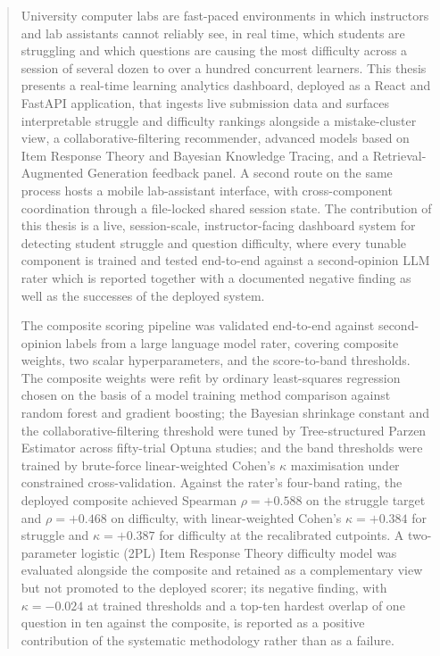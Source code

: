 \documentclass{article}
\numberwithin{figure}{section}
\numberwithin{table}{section}
\numberwithin{equation}{section}
\begin{document}
\begin{titlepage}

\end{titlepage}


\begin{abstract}

University computer labs are fast-paced environments in which instructors and lab assistants cannot reliably see, in real time, which students are struggling and which questions are causing the most difficulty across a session of several dozen to over a hundred concurrent learners.
This thesis presents a real-time learning analytics dashboard, deployed as a React and FastAPI application, that ingests live submission data and surfaces interpretable struggle and difficulty rankings alongside a mistake-cluster view, a collaborative-filtering recommender, advanced models based on Item Response Theory and Bayesian Knowledge Tracing, and a Retrieval-Augmented Generation feedback panel.
A second route on the same process hosts a mobile lab-assistant interface, with cross-component coordination through a file-locked shared session state. 
The contribution of this thesis is a live, session-scale, instructor-facing dashboard system for detecting student struggle and question difficulty, where every tunable component is trained and tested end-to-end against a second-opinion LLM rater which is reported together with a documented negative finding as well as the successes of the deployed system.

The composite scoring pipeline was validated end-to-end against second-opinion labels from a large language model rater, covering composite weights, two scalar hyperparameters, and the score-to-band thresholds.
The composite weights were refit by ordinary least-squares regression chosen on the basis of a model training method comparison against random forest and gradient boosting; the Bayesian shrinkage constant and the collaborative-filtering threshold were tuned by Tree-structured Parzen Estimator across fifty-trial Optuna studies; and the band thresholds were trained by brute-force linear-weighted Cohen's $\kappa$ maximisation under constrained cross-validation.
Against the rater's four-band rating, the deployed composite achieved Spearman $\rho = +0.588$ on the struggle target and $\rho = +0.468$ on difficulty, with linear-weighted Cohen's $\kappa = +0.384$ for struggle and $\kappa = +0.387$ for difficulty at the recalibrated cutpoints.
A two-parameter logistic (2PL) Item Response Theory difficulty model was evaluated alongside the composite and retained as a complementary view but not promoted to the deployed scorer; its negative finding, with $\kappa = -0.024$ at trained thresholds and a top-ten hardest overlap of one question in ten against the composite, is reported as a positive contribution of the systematic methodology rather than as a failure.

\end{abstract}
\end{document}
